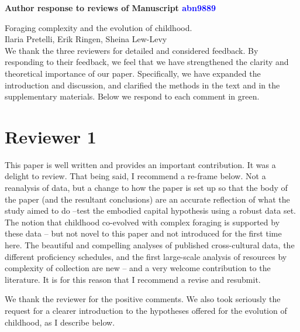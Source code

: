 \documentclass{article}
\newcommand{\rev}[1]{{\color{ForestGreen}#1}}
\begin{document}
\begin{center}
{\Large\bf Author response to reviews of Manuscript \textcolor{blue}{abn9889}}
\end{center}
{\Large Foraging complexity and the evolution of childhood.}\\[1em]
{Ilaria Pretelli, Erik Ringen, Sheina Lew-Levy}\\

We thank the three reviewers for detailed and considered feedback. By responding to their feedback, we feel that we have strengthened the clarity and theoretical importance of our paper. Specifically, we have expanded the introduction and discussion, and clarified the methods in the text and in the supplementary materials. Below we \rev{respond to each comment in green}.

\section{Reviewer 1}
This paper is well written and provides an important contribution. It was a delight to review. That being said, I recommend a re-frame below. Not a reanalysis of data, but a change to how the paper is set up so that the body of the paper (and the resultant conclusions) are an accurate reflection of what the study aimed to do –test the embodied capital hypothesis using a robust data set. The notion that childhood co-evolved with complex foraging is supported by these data – but not novel to this paper and not introduced for the first time here.
The beautiful and compelling analyses of published cross-cultural data, the different proficiency schedules, and the first large-scale analysis of resources by complexity of collection are new – and a very welcome contribution to the literature. It is for this reason that I recommend a revise and resubmit.


\rev{We thank the reviewer for the positive comments. We also took seriously the request for a clearer introduction to the hypotheses offered for the evolution of childhood, as I describe below. }
\end{document}
